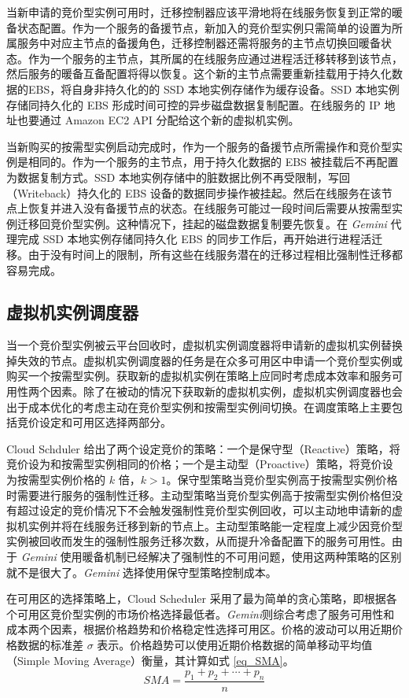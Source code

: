 当新申请的竞价型实例可用时，迁移控制器应该平滑地将在线服务恢复到正常的暖备状态配置。作为一个服务的备援节点，新加入的竞价型实例只需简单的设置为所属服务中对应主节点的备援角色，迁移控制器还需将服务的主节点切换回暖备状态。作为一个服务的主节点，其所属的在线服务应通过进程活迁移转移到该节点，然后服务的暖备互备配置将得以恢复。这个新的主节点需要重新挂载用于持久化数据的EBS，将自身非持久化的的 SSD 本地实例存储作为缓存设备。SSD 本地实例存储同持久化的 EBS 形成时间可控的异步磁盘数据复制配置。在线服务的 IP 地址也要通过 Amazon EC2 API 分配给这个新的虚拟机实例。

当新购买的按需型实例启动完成时，作为一个服务的备援节点所需操作和竞价型实例是相同的。作为一个服务的主节点，用于持久化数据的 EBS 被挂载后不再配置为数据复制方式。SSD 本地实例存储中的脏数据比例不再受限制，写回（Writeback）持久化的 EBS 设备的数据同步操作被挂起。然后在线服务在该节点上恢复并进入没有备援节点的状态。在线服务可能过一段时间后需要从按需型实例迁移回竞价型实例。这种情况下，挂起的磁盘数据复制要先恢复。在 \emph{Gemini} 代理完成 SSD 本地实例存储同持久化 EBS 的同步工作后，再开始进行进程活迁移。由于没有时间上的限制，所有这些在线服务潜在的迁移过程相比强制性迁移都容易完成。

\subsection{虚拟机实例调度器}
当一个竞价型实例被云平台回收时，虚拟机实例调度器将申请新的虚拟机实例替换掉失效的节点。虚拟机实例调度器的任务是在众多可用区中申请一个竞价型实例或购买一个按需型实例。获取新的虚拟机实例在策略上应同时考虑成本效率和服务可用性两个因素。除了在被动的情况下获取新的虚拟机实例，虚拟机实例调度器也会出于成本优化的考虑主动在竞价型实例和按需型实例间切换。在调度策略上主要包括竞价设定和可用区选择两部分。

Cloud Schduler \cite{He:2015:CCH:2749246.2749275} 给出了两个设定竞价的策略：一个是保守型（Reactive）策略，将竞价设为和按需型实例相同的价格；一个是主动型（Proactive）策略，将竞价设为按需型实例价格的 $k$ 倍，$k > 1$。保守型策略当竞价型实例高于按需型实例价格时需要进行服务的强制性迁移。主动型策略当竞价型实例高于按需型实例价格但没有超过设定的竞价情况下不会触发强制性竞价型实例回收，可以主动地申请新的虚拟机实例并将在线服务迁移到新的节点上。主动型策略能一定程度上减少因竞价型实例被回收而发生的强制性服务迁移次数，从而提升冷备配置下的服务可用性。由于 \emph{Gemini} 使用暖备机制已经解决了强制性的不可用问题，使用这两种策略的区别就不是很大了。\emph{Gemini} 选择使用保守型策略控制成本。

在可用区的选择策略上，Cloud Scheduler 采用了最为简单的贪心策略，即根据各个可用区竞价型实例的市场价格选择最低者。\emph{Gemini}则综合考虑了服务可用性和成本两个因素，根据价格趋势和价格稳定性选择可用区。价格的波动可以用近期价格数据的标准差 $\sigma$ 表示。价格趋势可以使用近期价格数据的简单移动平均值（Simple Moving Average）衡量，其计算如式 \eqref{eq_SMA}。
\begin{equation}\label{eq_SMA}
SMA = \frac{p_1 + p_2 + \cdots + p_n}{n}
\end{equation}

